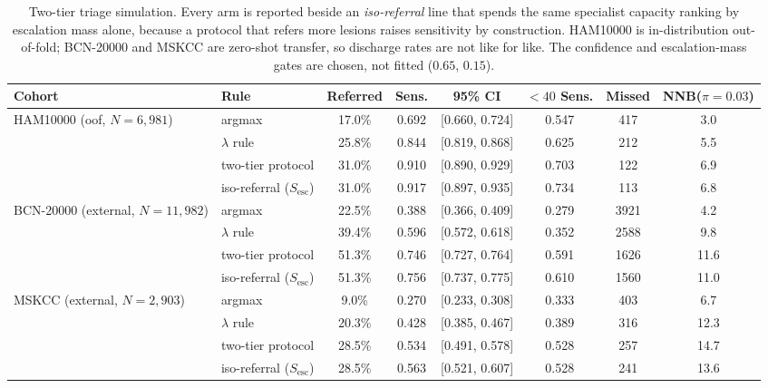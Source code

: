 \begin{table}[t]
\caption{Two-tier triage simulation. Every arm is reported beside an \emph{iso-referral} line that spends the same specialist capacity ranking by escalation mass alone, because a protocol that refers more lesions raises sensitivity by construction. HAM10000 is in-distribution out-of-fold; BCN-20000 and MSKCC are zero-shot transfer, so discharge rates are not like for like. The confidence and escalation-mass gates are chosen, not fitted ($0.65$, $0.15$).}
\label{tab:clinical_simulation}
\centering
\footnotesize
\begin{tabular}{llcccccc}
\toprule
\textbf{Cohort} & \textbf{Rule} & \textbf{Referred} & \textbf{Sens.} & \textbf{95\% CI} & \textbf{$<40$ Sens.} & \textbf{Missed} & \textbf{NNB($\pi=0.03$)} \\
\midrule
HAM10000 (oof, $N=6,981$) & argmax & 17.0\% & 0.692 & [0.660, 0.724] & 0.547 & 417 & 3.0 \\
 & $\lambda$ rule & 25.8\% & 0.844 & [0.819, 0.868] & 0.625 & 212 & 5.5 \\
 & two-tier protocol & 31.0\% & 0.910 & [0.890, 0.929] & 0.703 & 122 & 6.9 \\
 & \quad iso-referral ($S_{\mathrm{esc}}$) & 31.0\% & 0.917 & [0.897, 0.935] & 0.734 & 113 & 6.8 \\
\midrule
BCN-20000 (external, $N=11,982$) & argmax & 22.5\% & 0.388 & [0.366, 0.409] & 0.279 & 3921 & 4.2 \\
 & $\lambda$ rule & 39.4\% & 0.596 & [0.572, 0.618] & 0.352 & 2588 & 9.8 \\
 & two-tier protocol & 51.3\% & 0.746 & [0.727, 0.764] & 0.591 & 1626 & 11.6 \\
 & \quad iso-referral ($S_{\mathrm{esc}}$) & 51.3\% & 0.756 & [0.737, 0.775] & 0.610 & 1560 & 11.0 \\
\midrule
MSKCC (external, $N=2,903$) & argmax & 9.0\% & 0.270 & [0.233, 0.308] & 0.333 & 403 & 6.7 \\
 & $\lambda$ rule & 20.3\% & 0.428 & [0.385, 0.467] & 0.389 & 316 & 12.3 \\
 & two-tier protocol & 28.5\% & 0.534 & [0.491, 0.578] & 0.528 & 257 & 14.7 \\
 & \quad iso-referral ($S_{\mathrm{esc}}$) & 28.5\% & 0.563 & [0.521, 0.607] & 0.528 & 241 & 13.6 \\
\bottomrule
\end{tabular}
\end{table}
